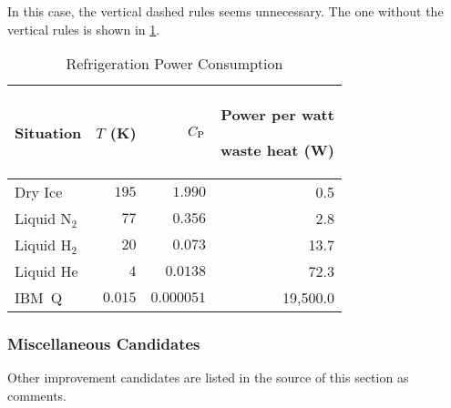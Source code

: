 In this case, the vertical dashed rules seems unnecessary.
The one without the vertical rules is shown in
\cref{tab:app:styleguide:Refrigeration Power Consumption (arydshln-2)}.

\begin{table}[H]
\renewcommand*{\arraystretch}{1.2}\centering\small
\begin{tabular}{lrrr}\toprule
Situation
	& $T$ (K)
		& $C_\mathrm{P}$ & \parbox[b]{.75in}{\raggedleft Power per watt\par waste heat (W)} \\
\midrule
Dry Ice
	& $195$
		& $1.990$
			& 0.5 \\ \hdashline
Liquid N$_2$
	& $77$
		& $0.356$
			& 2.8 \\ \hdashline
Liquid H$_2$
	& $20$
		& $0.073$
			& 13.7 \\ \hdashline
Liquid He
	& $4$
		& $0.0138$
			& 72.3 \\ \hdashline
IBM~Q	& $0.015$
		& $0.000051$
			& 19,500.0 \\
\bottomrule
\end{tabular}
\caption{Refrigeration Power Consumption}
\label{tab:app:styleguide:Refrigeration Power Consumption (arydshln-2)}
\end{table}


\subsubsection{Miscellaneous Candidates}
\label{sec:app:styleguide:Miscellaneous Candidates}

Other improvement candidates are listed in the source of this
section as comments.

%
%
